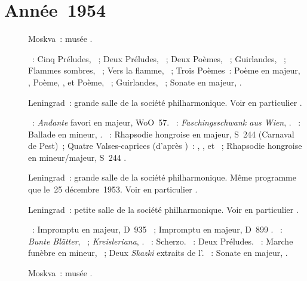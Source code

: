 \section{Année~1954}

\begin{description}
 \item[]
 Moskva~: musée \Scriabine{}.

 \textsc{\Scriabine{}}~: Cinq Préludes, ~; Deux Préludes,
 ~; Deux Poèmes, ~; Guirlandes,  ~;
 Flammes sombres,  ~; Vers la flamme, ~; Trois
 Poèmes~: Poème en \kC majeur,  , Poème, 
 , et Poème,  ~; Guirlandes, 
 ~; Sonate en \kF \Sharp majeur, .
 \item[]
 Leningrad~: grande salle de la société philharmonique.
 Voir en particulier \citet[p.~444]{Milshteyn82a}.

 \textsc{\Beethoven{}}~: \emph{Andante} favori en \kF majeur, WoO~57.
 \textsc{\Schumann{}}~: \emph{Faschingsschwank aus Wien}, .
 \textsc{\Chopin{}}~: Ballade en \kG mineur, .
 \textsc{\Liszt{}}~: Rhapsodie hongroise  en \kE \Flat majeur,
 S~244  (Carnaval de Pest)~; Quatre Valses-caprices (d'après
 \Schubert{})~: , ,  et ~; Rhapsodie
 hongroise  en \kC \Sharp mineur/\kF \Sharp majeur, S~244
 .
 \item[]
 Leningrad~: grande salle de la société philharmonique.
 Même programme que le~25 décembre~1953.
 Voir en particulier \citet[p.~444]{Milshteyn82a}.
 \item[]
 Leningrad~: petite salle de la société philharmonique.
 Voir en particulier \citet[p.~444]{Milshteyn82a}.

 \textsc{\Schubert{}}~: Impromptu en \kA \Flat majeur, D~935 ~;
 Impromptu en \kG \Flat majeur, D~899 .
 \textsc{\Schumann{}}~: \emph{Bunte Blätter}, ~;
 \emph{Kreisleriana}, .
 \textsc{\Chopin{}}~: Scherzo.
 \textsc{\Rachmaninov{}}~: Deux Préludes.
 \textsc{\Medtner{}}~: Marche funèbre en \kB mineur,  ~;
 Deux \emph{Skazki} extraits de l'.
 \textsc{\Scriabine{}}~: Sonate en \kF \Sharp majeur, .
 \item[]
 Moskva~: musée \Scriabine{}.


\end{description}
